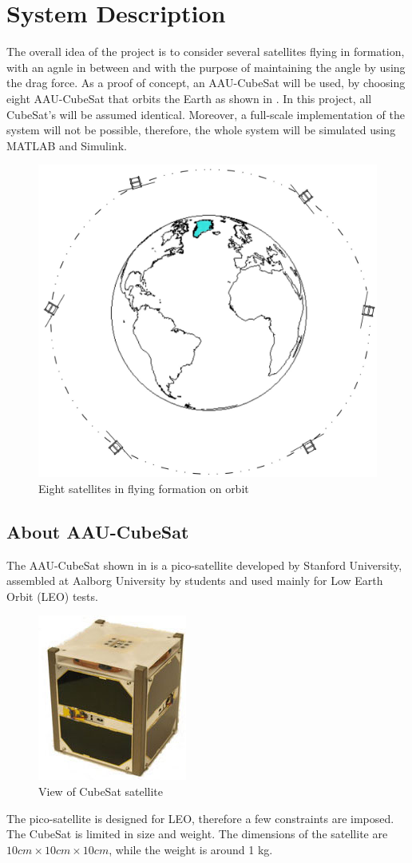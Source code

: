 \chapter{System Description}\label{chap:systemDescribtion}
The overall idea of the project is to consider several satellites flying in formation, with an agnle in between and with the purpose of maintaining the angle by using the drag force. As a proof of concept, an AAU-CubeSat will be used, by choosing eight AAU-CubeSat that orbits the Earth as shown in  . In this project, all CubeSat's will be assumed identical. Moreover, a full-scale implementation of the system will not be possible, therefore, the whole system will be simulated using MATLAB and Simulink. 
%
\begin{figure}[H]
	\centering
	\includegraphics[width=0.7\linewidth]{figures/sat_form}
	\caption{Eight satellites in flying formation on orbit}
	\label{fig:1}
\end{figure}
%
\section{About AAU-CubeSat}
The AAU-CubeSat shown in  is a pico-satellite developed by Stanford University,  assembled at Aalborg University by students and used mainly for Low Earth Orbit (LEO)  tests.
\begin{figure}[H]
	\centering
	\includegraphics[width=0.3\linewidth]{figures/cub}
	\caption{View of CubeSat satellite \cite{cs}}
	\label{fig:pico}
\end{figure}
The pico-satellite is designed for LEO, therefore a few constraints are imposed. The CubeSat is limited in size and weight. The dimensions of the satellite are $10cm\times10cm\times10cm$, while the weight is around 1 kg.\cite{CDS}

